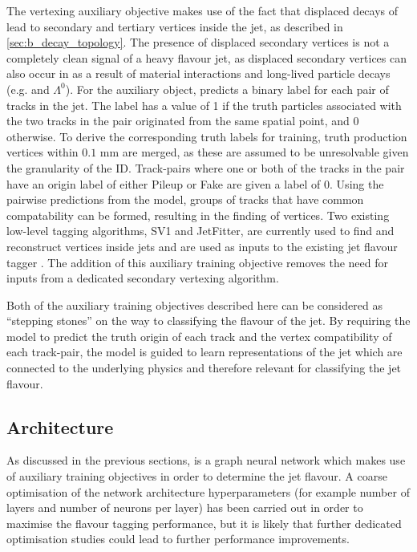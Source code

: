 The vertexing auxiliary objective makes use of the fact that displaced decays of \bchadrons lead to secondary and tertiary vertices inside the jet, as described in \cref{sec:b_decay_topology}.
The presence of displaced secondary vertices is not a completely clean signal of a heavy flavour jet, as displaced secondary vertices can also occur in \ljets as a result of material interactions and long-lived particle decays (e.g. \Kshort and $\Lambda^0$).
For the auxiliary object, \GNN predicts a binary label for each pair of tracks in the jet.
The label has a value of 1 if the truth particles associated with the two tracks in the pair originated from the same spatial point, and 0 otherwise. 
To derive the corresponding truth labels for training, truth production vertices within $0.1$ mm are merged, as these are assumed to be unresolvable given the granularity of the ID. 
Track-pairs where one or both of the tracks in the pair have an origin label of either Pileup or Fake are given a label of 0.
Using the pairwise predictions from the model, groups of tracks that have common compatability can be formed, resulting in the finding of vertices.
Two existing low-level tagging algorithms, SV1 and JetFitter, are currently used to find and reconstruct vertices inside jets and are used as inputs to the existing jet flavour tagger \DLr.
The addition of this auxiliary training objective removes the need for inputs from a dedicated secondary vertexing algorithm.

Both of the auxiliary training objectives described here can be considered as ``stepping stones'' on the way to classifying the flavour of the jet. 
By requiring the model to predict the truth origin of each track and the vertex compatibility of each track-pair, the model is guided to learn representations of the jet which are connected to the underlying physics and therefore relevant for classifying the jet flavour. 


\subsection{Architecture}\label{sec:Architecture}

As discussed in the previous sections, \GNN is a graph neural network which makes use of auxiliary training objectives in order to determine the jet flavour.
A coarse optimisation of the network architecture hyperparameters (for example number of layers and number of neurons per layer) has been carried out in order to maximise the flavour tagging performance, but it is likely that further dedicated optimisation studies could lead to further performance improvements. 

